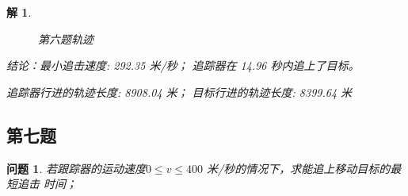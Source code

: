\documentclass[a4paper, 12pt]{ctexart}
\newtheorem*{theorem}{解}
\newtheorem*{example}{问题}
\begin{document}
\begin{theorem}
\begin{figure}[h]
    \caption*{第六题轨迹}
\end{figure}
结论：最小追击速度: 292.35 米/秒；
追踪器在 14.96 秒内追上了目标。 

\quad 追踪器行进的轨迹长度: 8908.04 米；
目标行进的轨迹长度: 8399.64 米
\end{theorem}


\subsection{第七题}

\begin{example}
    若跟踪器的运动速度$0\leq v \leq 400$ 米/秒的情况下，求能追上移动目标的最短追击
    时间；
\end{example}
\end{document}

